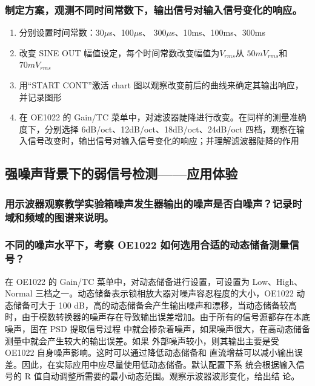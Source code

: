 \documentclass[11pt,a4paper]{ctexart}
\begin{document}
		\subsubsection{制定方案，观测不同时间常数下，输出信号对输入信号变化的响应。}
		\begin{enumerate}
			\item 分别设置时间常数：30$\mu$s、100$\mu$s、
			300$\mu$s、10ms、100ms、300ms
			\item 改变 SINE OUT 幅值设定，每个时间常数改变幅值为$V_{rms}$从 $50mV_{rms}$和$70mV_{rms}$
			\item 用“START CONT”激活 chart 图以观察改变前后的曲线来确定其输出响应，并记录图形
		
		\item 在 OE1022 的 Gain/TC 菜单中，对滤波器陡降进行改变。在同样的测量准确度下，分别选择 6dB/oct、12dB/oct、18dB/oct、24dB/oct 四档，观察在输入信号改变时，输出信号对输入信号变化的响应；并理解滤波器陡降的作用
	\end{enumerate}
	\subsection{强噪声背景下的弱信号检测——应用体验}
	\subsubsection{用示波器观察教学实验箱噪声发生器输出的噪声是否白噪声？记录时域和频域的图谱来说明。}
	\subsubsection{不同的噪声水平下，考察 OE1022 如何选用合适的动态储备测量信号？}
	在 OE1022 的 Gain/TC 菜单中，对动态储备进行设置，可设置为 Low、High、Normal
	三档之一。动态储备表示锁相放大器对噪声容忍程度的大小，OE1022 动态储备可大于
	100 dB，高的动态储备会产生输出噪声和漂移，当动态储备较高时，由于模数转换器的噪声存在导致输出误差增加。由于所有的信号源都存在本底噪声，固在 PSD 提取信号过程
	中就会掺杂着噪声，如果噪声很大，在高动态储备测量中就会产生较大的输出误差。如果
	外部噪声较小，则其输出主要是受 OE1022 自身噪声影响。这时可以通过降低动态储备和
	直流增益可以减小输出误差。因此，在实际应用中应尽量使用低动态储备。默认配置下系
	统会根据输入信号的 R 值自动调整所需要的最小动态范围。观察示波器波形变化，给出结
	论。
\end{document}
